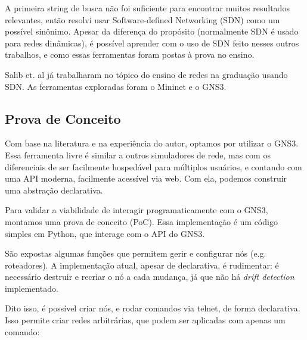 \documentclass[12pt]{article}
\begin{document}
A primeira string de busca não foi suficiente para encontrar muitos resultados
relevantes, então resolvi usar Software-defined Networking (SDN) como um
possível sinônimo. Apesar da diferença do propósito (normalmente SDN é usado
para redes dinâmicas\cite{vsuh2017designing}), é possível aprender com o uso de
SDN feito nesses outros trabalhos, e como essas ferramentas foram postas à
prova no ensino.

Salib et. al\cite{salib2018hands} já trabalharam no tópico do ensino de redes
na graduação usando SDN. As ferramentas exploradas foram o
Mininet\cite{mininet} e o GNS3\cite{gns3api}.



\subsection{Prova de Conceito}

Com base na literatura e na experiência do autor, optamos por utilizar o
GNS3\cite{gns3api}. Essa ferramenta livre é similar a outros simuladores de
rede, mas com os diferenciais de ser facilmente hospedável para múltiplos
usuários, e contando com uma API moderna, facilmente acessível via web. Com
ela, podemos construir uma abstração declarativa.

Para validar a viabilidade de interagir programaticamente com o GNS3, montamos
uma prova de conceito (PoC). Essa implementação é um código simples em Python,
que interage com o API do GNS3\cite{gns3api}.

São expostas algumas funções que permitem gerir e configurar nós (e.g.
roteadores). A implementação atual, apesar de declarativa, é rudimentar: é
necessário destruir e recriar o nó a cada mudança, já que não há \textit{drift
detection} implementado.

Dito isso, é possível criar nós, e rodar comandos via telnet, de forma
declarativa. Isso permite criar redes arbitrárias, que podem ser aplicadas com
apenas um comando:
\end{document}
